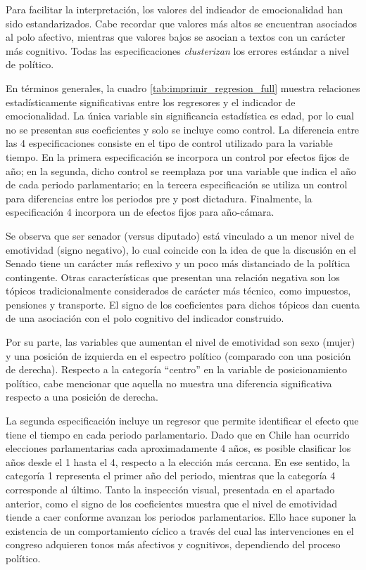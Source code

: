 \documentclass[
  12pt,
]{article}
\begin{document}
Para facilitar la interpretación, los valores del indicador de
emocionalidad han sido estandarizados. Cabe recordar que valores más
altos se encuentran asociados al polo afectivo, mientras que valores
bajos se asocian a textos con un carácter más cognitivo. Todas las
especificaciones \emph{clusterizan} los errores estándar a nivel de
político.

En términos generales, la cuadro \ref{tab:imprimir_regresion_full}
muestra relaciones estadísticamente significativas entre los regresores
y el indicador de emocionalidad. La única variable sin significancia
estadística es edad, por lo cual no se presentan sus coeficientes y solo
se incluye como control. La diferencia entre las 4 especificaciones
consiste en el tipo de control utilizado para la variable tiempo. En la
primera especificación se incorpora un control por efectos fijos de año;
en la segunda, dicho control se reemplaza por una variable que indica el
año de cada periodo parlamentario; en la tercera especificación se
utiliza un control para diferencias entre los periodos pre y post
dictadura. Finalmente, la especificación 4 incorpora un de efectos fijos
para año-cámara.

Se observa que ser senador (versus diputado) está vinculado a un menor
nivel de emotividad (signo negativo), lo cual coincide con la idea de
que la discusión en el Senado tiene un carácter más reflexivo y un poco
más distanciado de la política contingente. Otras características que
presentan una relación negativa son los tópicos tradicionalmente
considerados de carácter más técnico, como impuestos, pensiones y
transporte. El signo de los coeficientes para dichos tópicos dan cuenta
de una asociación con el polo cognitivo del indicador construido.

Por su parte, las variables que aumentan el nivel de emotividad son sexo
(mujer) y una posición de izquierda en el espectro político (comparado
con una posición de derecha). Respecto a la categoría ``centro'' en la
variable de posicionamiento político, cabe mencionar que aquella no
muestra una diferencia significativa respecto a una posición de derecha.

La segunda especificación incluye un regresor que permite identificar el
efecto que tiene el tiempo en cada periodo parlamentario. Dado que en
Chile han ocurrido elecciones parlamentarias cada aproximadamente 4
años, es posible clasificar los años desde el 1 hasta el 4, respecto a
la elección más cercana. En ese sentido, la categoría 1 representa el
primer año del periodo, mientras que la categoría 4 corresponde al
último. Tanto la inspección visual, presentada en el apartado anterior,
como el signo de los coeficientes muestra que el nivel de emotividad
tiende a caer conforme avanzan los periodos parlamentarios. Ello hace
suponer la existencia de un comportamiento cíclico a través del cual las
intervenciones en el congreso adquieren tonos más afectivos y
cognitivos, dependiendo del proceso político.
\end{document}
